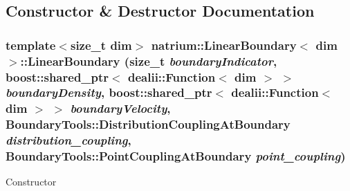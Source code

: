 \subsection{Constructor \& Destructor Documentation}
\hypertarget{classnatrium_1_1LinearBoundary_a58366f152d702561d9d30584e2c6970b}{
\subsubsection[{LinearBoundary}]{\setlength{\rightskip}{0pt plus 5cm}template$<$size\_\-t dim$>$ {\bf natrium::LinearBoundary}$<$ dim $>$::{\bf LinearBoundary} (size\_\-t {\em boundaryIndicator}, \/  boost::shared\_\-ptr$<$ dealii::Function$<$ dim $>$ $>$ {\em boundaryDensity}, \/  boost::shared\_\-ptr$<$ dealii::Function$<$ dim $>$ $>$ {\em boundaryVelocity}, \/  BoundaryTools::DistributionCouplingAtBoundary {\em distribution\_\-coupling}, \/  BoundaryTools::PointCouplingAtBoundary {\em point\_\-coupling})}}
\label{classnatrium_1_1LinearBoundary_a58366f152d702561d9d30584e2c6970b}
Constructor 
